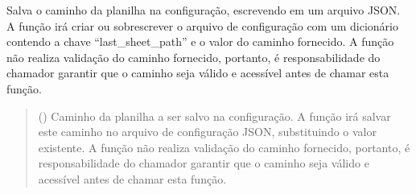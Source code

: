 \documentclass[letterpaper,10pt,english]{sphinxmanual}
\begin{document}
\begin{fulllineitems}
\label{\detokenize{api/config:config.save_sheet_config}}
\pysigstartsignatures
\pysiglinewithargsret
{}
{}
{}
\pysigstopsignatures
\sphinxAtStartPar
Salva o caminho da planilha na configuração, escrevendo em um arquivo JSON. A função irá criar ou sobrescrever o arquivo de configuração com um dicionário contendo a chave “last\_sheet\_path” e o valor do caminho fornecido. A função não realiza validação do caminho fornecido, portanto, é responsabilidade do chamador garantir que o caminho seja válido e acessível antes de chamar esta função.
\begin{quote}\begin{description}
\sphinxAtStartPar
{} () \textendash{} Caminho da planilha a ser salvo na configuração. A função irá salvar este caminho no arquivo de configuração JSON, substituindo o valor existente. A função não realiza validação do caminho fornecido, portanto, é responsabilidade do chamador garantir que o caminho seja válido e acessível antes de chamar esta função.

\sphinxAtStartPar
{}

\end{description}\end{quote}

\end{fulllineitems}

\end{document}
